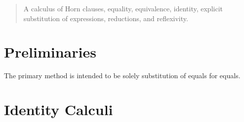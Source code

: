 \begin{abstract}
A calculus of Horn clauses, equality, equivalence, identity, explicit substitution of expressions, reductions, and reflexivity.
\end{abstract}

\part{Preliminaries}
\begin{center}
	\begin{flushleft}
		The primary method is intended to be solely substitution of equals for equals.
	\end{flushleft}


\end{center}

\newpage
\part{Identity Calculi}
